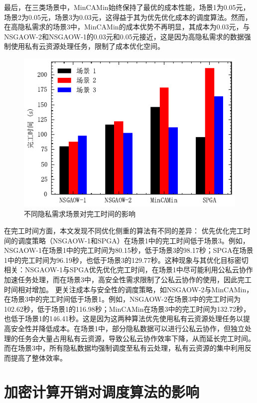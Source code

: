 最后，在三类场景中，MinCAMin始终保持了最优的成本性能，场景1为0.05元，场景2为0.05元，场景3为0.03元，这得益于其为优先优化成本的调度算法。然而，在高隐私需求的场景3中，MinCAMin的成本优势不再明显，其成本为0.03元，与NSGAOW-2和NSGAOW-1的0.03元和0.05元接近，这是因为高隐私需求的数据强制使用私有云资源处理任务，限制了成本优化空间。

\begin{figure}[htb]
    \includegraphics{img/min_secu_vs_makespan.pdf}
    \caption{不同隐私需求场景对完工时间的影响}
\end{figure}

在完工时间方面，本文发现不同优化侧重的算法有不同的差异：
优先优化完工时间的调度策略（NSGAOW-1和SPGA）在场景1中的完工时间低于场景3。例如，NSGAOW-1在场景1中的完工时间为80.15秒，低于场景3的98.17秒；SPGA在场景1中的完工时间为96.19秒，也低于场景3的129.77秒。这种现象与其优化目标密切相关：NSGAOW-1与SPGA优先优化完工时间，在场景1中尽可能利用公私云协作加速任务处理，而在场景3中，高安全性需求限制了公私云协作的使用，因此完工时间相对增加。
更关注成本与安全性的调度策略，如NSGAOW-2与MinCAMin，在场景3中的完工时间低于场景1。例如，NSGAOW-2在场景3中的完工时间为102.62秒，低于场景1的116.98秒；MinCAMin在场景3中的完工时间为132.72秒，也低于场景1的146.41秒。这是因为这两种算法优先使用私有云资源处理任务以提高安全性并降低成本。在场景1中，部分隐私数据可以进行公私云协作，但独立处理的任务会大量占用私有云资源，导致公私云协作效率下降，从而延长完工时间。而在场景3中，所有隐私数据均强制调度至私有云处理，私有云资源的集中利用反而提高了整体效率。

\section{加密计算开销对调度算法的影响}

